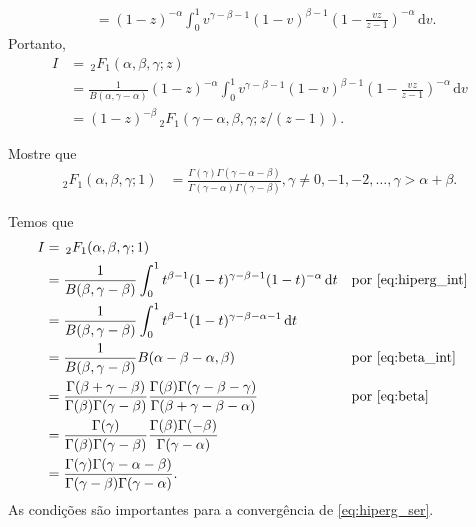 \documentclass[a4paper,12pt, leqno, answers]{exam}
\begin{document}
\begin{questions}
\begin{parts}
\begin{solution}
\begin{align*}
                &= (1 - z)^{-\alpha} \int_0^1 v^{\gamma - \beta - 1} (1 - v)^{\beta - 1} \left( 1 - \frac{vz}{z - 1} \right)^{-\alpha} \,\mathrm{d}v.
            \end{align*}
            Portanto,
            \begin{align*}
                I &= \,{}_2F_1(\alpha, \beta, \gamma; z) \\
                &= \frac{1}{B(\alpha, \gamma - \alpha)} (1 - z)^{-\alpha} \int_0^1 v^{\gamma - \beta - 1} (1 - v)^{\beta - 1} \left( 1 - \frac{vz}{z - 1} \right)^{-\alpha} \,\mathrm{d}v \\
                &= (1 - z)^{-\beta} \,_2F_1(\gamma - \alpha, \beta, \gamma; z / (z - 1)).
            \end{align*}
        \end{solution}
    \end{parts}

     Mostre que
    \begin{align*}
        _2F_1(\alpha, \beta, \gamma; 1) &= \frac{\Gamma(\gamma)\Gamma(\gamma - \alpha - \beta)}{\Gamma(\gamma - \alpha) \Gamma(\gamma - \beta)}, \gamma \neq 0, -1, -2, \ldots, \gamma > \alpha + \beta.
    \end{align*}
    \begin{solution}
        Temos que
        \begin{align*}
            I &= \,{}_2F_1(\alpha, \beta, \gamma; 1) \\
            &= \frac{1}{B(\beta, \gamma - \beta)} \int_0^1 t^{\beta - 1} (1 - t)^{\gamma - \beta - 1} (1 - t)^{-\alpha} \,\mathrm{d}t && \text{por \eqref{eq:hiperg_int}} \\
            &= \frac{1}{B(\beta, \gamma - \beta)} \int_0^1 t^{\beta - 1} (1 - t)^{\gamma - \beta - \alpha - 1} \,\mathrm{d}t \\
            &= \frac{1}{B(\beta, \gamma - \beta)} B(\alpha - \beta - \alpha, \beta) && \text{por \eqref{eq:beta_int}} \\
            &= \frac{\Gamma(\beta + \gamma - \beta)}{\Gamma(\beta) \Gamma(\gamma - \beta)} \frac{\Gamma(\beta) \Gamma(\gamma - \beta - \gamma)}{\Gamma(\beta + \gamma - \beta - \alpha)} && \text{por \eqref{eq:beta}} \\
            &= \frac{\Gamma(\gamma)}{\Gamma(\beta) \Gamma(\gamma - \beta)} \frac{\Gamma(\beta) \Gamma(- \beta)}{\Gamma(\gamma - \alpha)} \\
            &= \frac{\Gamma(\gamma) \Gamma(\gamma - \alpha - \beta)}{\Gamma(\gamma - \beta) \Gamma(\gamma - \alpha)}.
        \end{align*}
        As condi\c{c}\~{o}es s\~{a}o importantes para a converg\^{e}ncia de \eqref{eq:hiperg_ser}.
    \end{solution}


\end{questions}
\end{document}
